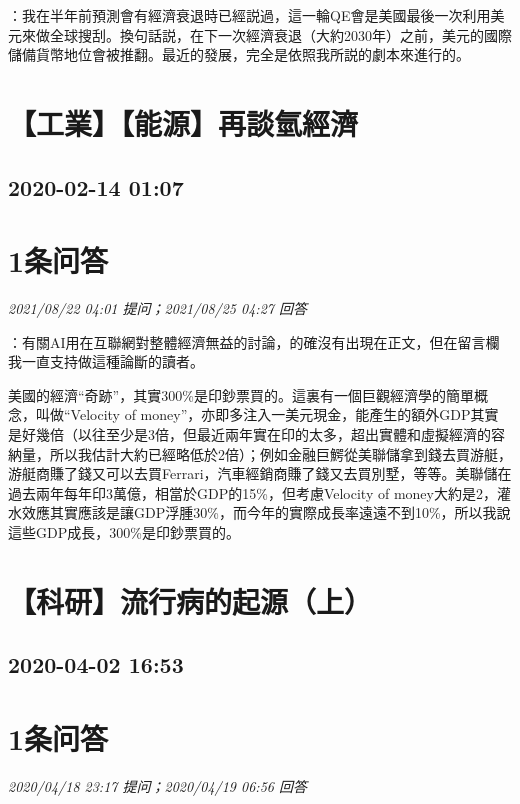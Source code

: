 \documentclass[twocolumn]{ctexart}
\begin{document}
：我在半年前預測會有經濟衰退時已經説過，這一輪QE會是美國最後一次利用美元來做全球搜刮。換句話説，在下一次經濟衰退（大約2030年）之前，美元的國際儲備貨幣地位會被推翻。最近的發展，完全是依照我所説的劇本來進行的。
\\


\section{【工業】【能源】再談氫經濟}
\subsection{2020-02-14 01:07}


\section{1条问答}

\textit{\hfill\noindent\small 2021/08/22 04:01 提问；2021/08/25 04:27 回答}

：有關AI用在互聯網對整體經濟無益的討論，的確沒有出現在正文，但在留言欄我一直支持做這種論斷的讀者。

美國的經濟“奇跡”，其實300\%是印鈔票買的。這裏有一個巨觀經濟學的簡單概念，叫做“Velocity of money”，亦即多注入一美元現金，能產生的額外GDP其實是好幾倍（以往至少是3倍，但最近兩年實在印的太多，超出實體和虛擬經濟的容納量，所以我估計大約已經略低於2倍）；例如金融巨鰐從美聯儲拿到錢去買游艇，游艇商賺了錢又可以去買Ferrari，汽車經銷商賺了錢又去買別墅，等等。美聯儲在過去兩年每年印3萬億，相當於GDP的15\%，但考慮Velocity of money大約是2，灌水效應其實應該是讓GDP浮腫30\%，而今年的實際成長率遠遠不到10\%，所以我說這些GDP成長，300\%是印鈔票買的。
\\


\section{【科研】流行病的起源（上）}
\subsection{2020-04-02 16:53}


\section{1条问答}

\textit{\hfill\noindent\small 2020/04/18 23:17 提问；2020/04/19 06:56 回答}
\end{document}
